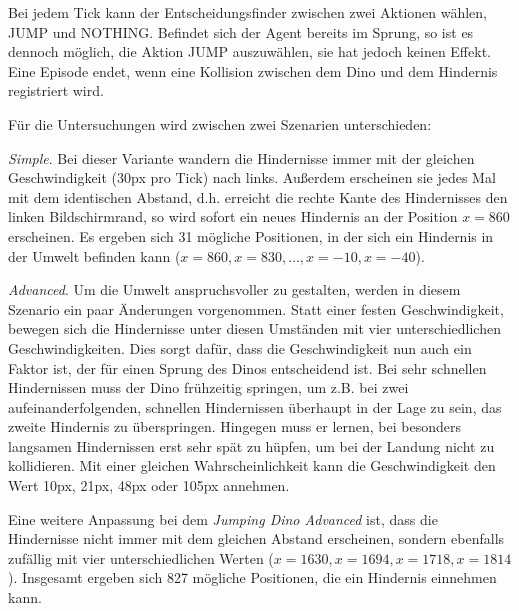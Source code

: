 Bei jedem Tick kann der Entscheidungsfinder zwischen zwei Aktionen wählen, JUMP und NOTHING. Befindet sich der Agent bereits im Sprung, so ist es dennoch möglich, die Aktion JUMP auszuwählen, sie hat jedoch keinen Effekt. Eine Episode endet, wenn eine Kollision zwischen dem Dino und dem Hindernis registriert wird.
\par 
Für die Untersuchungen wird zwischen zwei Szenarien unterschieden:
\par 
\textit{Simple}. Bei dieser Variante wandern die Hindernisse immer mit der gleichen Geschwindigkeit (30px pro Tick) nach links. Außerdem erscheinen sie jedes Mal mit dem identischen Abstand, d.h. erreicht die rechte Kante des Hindernisses den linken Bildschirmrand, so wird sofort ein neues Hindernis an der Position $x=860$ erscheinen. Es ergeben sich 31 mögliche Positionen, in der sich ein Hindernis in der Umwelt befinden kann ($x=860, x=830, \dots, x=-10, x=-40$).
\par 
\textit{Advanced}. Um die Umwelt anspruchsvoller zu gestalten, werden in diesem Szenario ein paar Änderungen vorgenommen. Statt einer festen Geschwindigkeit, bewegen sich die Hindernisse unter diesen Umständen mit vier unterschiedlichen Geschwindigkeiten. Dies sorgt dafür, dass die Geschwindigkeit nun auch ein Faktor ist, der für einen Sprung des Dinos entscheidend ist. Bei sehr schnellen Hindernissen muss der Dino frühzeitig springen, um z.B. bei zwei aufeinanderfolgenden, schnellen Hindernissen überhaupt in der Lage zu sein, das zweite Hindernis zu überspringen. Hingegen muss er lernen, bei besonders langsamen Hindernissen erst sehr spät zu hüpfen, um bei der Landung nicht zu kollidieren. Mit einer gleichen Wahrscheinlichkeit kann die Geschwindigkeit den Wert 10px, 21px, 48px oder 105px annehmen.
\par
Eine weitere Anpassung bei dem \textit{Jumping Dino Advanced} ist, dass die Hindernisse nicht immer mit dem gleichen Abstand erscheinen, sondern ebenfalls zufällig mit vier unterschiedlichen Werten ($x=1630, x=1694, x=1718, x=1814$). Insgesamt ergeben sich 827 mögliche Positionen, die ein Hindernis einnehmen kann.

